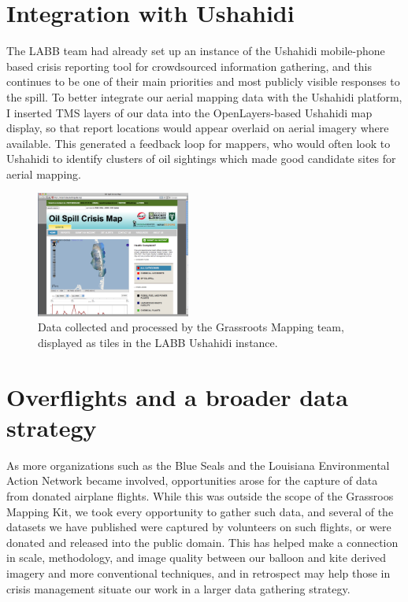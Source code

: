\documentclass[11pt,oneside,notitlepage]{report}
\begin{document}
\section{Integration with Ushahidi}

The \ac{LABB} team had already set up an instance of the Ushahidi mobile-phone based crisis reporting tool for crowdsourced information gathering, and this continues to be one of their main priorities and most publicly visible responses to the spill. To better integrate our aerial mapping data with the Ushahidi platform, I inserted \ac{TMS} layers of our data into the OpenLayers-based Ushahidi map display, so that report locations would appear overlaid on aerial imagery where available. This generated a feedback loop for mappers, who would often look to Ushahidi to identify clusters of oil sightings which made good candidate sites for aerial mapping.

\begin{figure}
	\begin{flushright}
		\includegraphics[width=0.45\textwidth]{images/labb-ushahidi.png}
		\caption{Data collected and processed by the Grassroots Mapping team, displayed as tiles in the LABB Ushahidi instance.}
	\end{flushright}
\end{figure}

\section{Overflights and a broader data strategy}

As more organizations such as the Blue Seals and the Louisiana Environmental Action Network became involved, opportunities arose for the capture of data from donated airplane flights. While this was outside the scope of the Grassroos Mapping Kit, we took every opportunity to gather such data, and several of the datasets we have published were captured by volunteers on such flights, or were donated and released into the public domain. This has helped make a connection in scale, methodology, and image quality between our balloon and kite derived imagery and more conventional techniques, and in retrospect may help those in crisis management situate our work in a larger data gathering strategy. 
\end{document}
